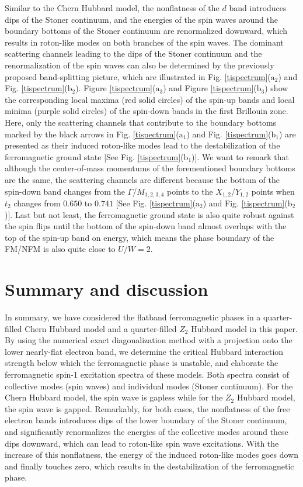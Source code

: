 \documentclass[amsmath,superscriptaddress,showpacs,aps,prb,twocolumn]{revtex4-1}
\begin{document}
\par Similar to the Chern Hubbard model, the nonflatness of the $d$ band introduces dips of the Stoner continuum, and the energies of the spin waves around the boundary bottoms of the Stoner continuum are renormalized downward, which results in roton-like modes on both branches of the spin waves. The dominant scattering channels leading to the dips of the Stoner continuum and the renormalization of the spin waves can also be determined by the previously proposed band-splitting picture, which are illustrated in Fig. \ref{tispectrum}($\text{a}_2$) and Fig. \ref{tispectrum}($\text{b}_2$). Figure \ref{tispectrum}($\text{a}_3$) and Figure \ref{tispectrum}($\text{b}_3$) show the corresponding local maxima (red solid circles) of the spin-up bands and local minima (purple solid circles) of the spin-down bands in the first Brillouin zone. Here, only the scattering channels that contribute to the boundary bottoms marked by the black arrows in Fig. \ref{tispectrum}($\text{a}_1$) and Fig. \ref{tispectrum}($\text{b}_1$) are presented as their induced roton-like modes lead to the destabilization of the ferromagnetic ground state [See Fig. \ref{tispectrum}($\text{b}_1$)]. We want to remark that although the center-of-mass momentums of the forementioned boundary bottoms are the same, the scattering channels are different because the bottom of the spin-down band changes from the $\Gamma$/$M_{1,2,3,4}$ points to the $X_{1,2}$/$Y_{1,2}$ points when $t_2$ changes from $0.650$ to $0.741$ [See Fig. \ref{tispectrum}($\text{a}_2$) and Fig. \ref{tispectrum}($\text{b}_2$)]. Last but not least, the ferromagnetic ground state is also quite robust against the spin flips until the bottom of the spin-down band almost overlaps with the top of the spin-up band on energy, which means the phase boundary of the FM/NFM is also quite close to $U/W=2$.

\section{Summary and discussion}\label{sd}
\par In summary, we have considered the flatband ferromagnetic phases in a quarter-filled Chern Hubbard model and a quarter-filled $Z_2$ Hubbard model in this paper. By using the numerical exact diagonalization method with a projection onto the lower nearly-flat electron band, we determine the critical Hubbard interaction strength below which the ferromagnetic phase is unstable, and elaborate the ferromagnetic spin-1 excitation spectra of these models. Both spectra consist of collective modes (spin waves) and individual modes (Stoner continuum). For the Chern Hubbard model, the spin wave is gapless while for the $Z_2$ Hubbard model, the spin wave is gapped. Remarkably, for both cases, the nonflatness of the free electron bands introduces dips of the lower boundary of the Stoner continuum, and significantly renormalizes the energies of the collective modes around these dips downward, which can lead to roton-like spin wave excitations. With the increase of this nonflatness, the energy of the induced roton-like modes goes down and finally touches zero, which results in the destabilization of the ferromagnetic phase.
\end{document}
